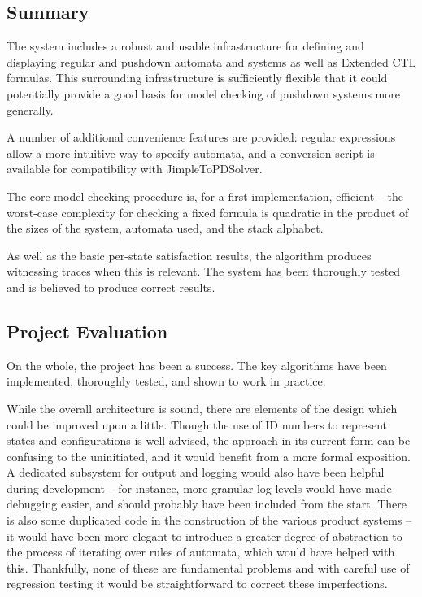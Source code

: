\documentclass[11pt]{article}
\theoremstyle{definition}
\begin{document}
\subsection{Summary}

The system includes a robust and usable infrastructure for defining and
displaying regular and pushdown automata and systems as well as Extended CTL
formulas.  This surrounding infrastructure is sufficiently flexible that it
could potentially provide a good basis for model checking of pushdown systems
more generally.

A number of additional convenience features are provided: regular expressions
allow a more intuitive way to specify automata, and a conversion script is
available for compatibility with JimpleToPDSolver. 

The core model checking procedure is, for a first implementation, efficient --
the worst-case complexity for checking a fixed formula is quadratic in the
product of the sizes of the system, automata used, and the stack alphabet.

As well as the basic per-state satisfaction results, the algorithm produces
witnessing traces when this is relevant.  The system has been thoroughly tested
and is believed to produce correct results.

\subsection{Project Evaluation}

On the whole, the project has been a success. The key algorithms have been
implemented, thoroughly tested, and shown to work in practice.

While the overall architecture is sound, there are elements of the design which
could be improved upon a little. Though the use of ID numbers to represent
states and configurations is well-advised, the approach in its current form can
be confusing to the uninitiated, and it would benefit from a more formal
exposition. A dedicated subsystem for output and logging would also have been
helpful during development -- for instance, more granular log levels would have
made debugging easier, and should probably have been included from the start.
There is also some duplicated code in the construction of the various product
systems -- it would have been more elegant to introduce a greater degree of
abstraction to the process of iterating over rules of automata, which would
have helped with this. Thankfully, none of these are fundamental problems and
with careful use of regression testing it would be straightforward to correct
these imperfections.
\end{document}
